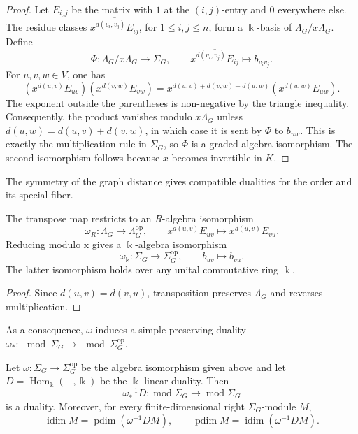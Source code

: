 \documentclass[a4paper,leqno]{amsart}
\begin{document}
\begin{proof}
Let $E_{i,j}$ be the matrix with $1$ at the $(i,j)$-entry and $0$ everywhere else.  The residue classes
$\overline{x^{d(v_i,v_j)}E_{ij}}$, for $1\leq i,j\leq n$,
form a $\Bbbk$-basis of $\Lambda_G/x\Lambda_G$.  Define
\[
\Phi:\Lambda_G/x\Lambda_G\longrightarrow\Sigma_G,
\qquad
\overline{x^{d(v_i,v_j)}E_{ij}}\longmapsto b_{v_i v_j}.
\]
For $u,v,w\in V$, one has
\[
(x^{d(u,v)}E_{uv})(x^{d(v,w)}E_{vw})
=x^{d(u,v)+d(v,w)-d(u,w)}
 (x^{d(u,w)}E_{uw}).
\]
The exponent outside the parentheses is non-negative by the triangle
inequality.  Consequently, the product vanishes modulo
$x\Lambda_G$ unless
$d(u,w)=d(u,v)+d(v,w)$, in which case it is sent by $\Phi$ to
$b_{uw}$.  This is exactly the multiplication rule in $\Sigma_G$,
so $\Phi$ is a graded algebra isomorphism.  The second isomorphism
follows because $x$ becomes invertible in $K$.
\end{proof}

The symmetry of the graph distance gives compatible dualities for the order and its special fiber.

\begin{lem}\label{lem:anti-iso}
The transpose map restricts to an $R$-algebra isomorphism
\[
\omega_R:\Lambda_G\longrightarrow\Lambda_G^{\operatorname{op}},
\qquad
x^{d(u,v)}E_{uv}\longmapsto x^{d(u,v)}E_{vu}.
\]
Reducing modulo x gives a $\Bbbk$-algebra isomorphism
\[
\omega_{\Bbbk}:\Sigma_G\longrightarrow
\Sigma_G^{\operatorname{op}},
\qquad
b_{uv}\longmapsto b_{vu}.
\]
The latter isomorphism holds over any unital commutative ring $\Bbbk$.
\end{lem}

\begin{proof}
Since $d(u,v)=d(v,u)$, transposition preserves $\Lambda_G$ and
reverses multiplication.
\end{proof}

As a consequence, $\omega$ induces  a simple-preserving duality $\omega_*:\mod \Sigma_G \to \mod \Sigma_G^{\operatorname{op}}$.

\begin{prop}\label{prop:dual-functor}
Let $\omega:\Sigma_G\rightarrow \Sigma_G^{\operatorname{op}}$
be the algebra isomorphism given above and let $D=\operatorname{Hom}_{\Bbbk}(-,\Bbbk)$ be the $\Bbbk$-linear duality. Then
$$\omega_*^{-1}D:\operatorname{mod} \Sigma_G\longrightarrow \operatorname{mod} \Sigma_G$$ is a duality. Moreover, for every finite-dimensional right $\Sigma_G$-module $M$, 
$$\operatorname{idim}M=\operatorname{pdim}(\omega^{-1}DM),
\qquad\operatorname{pdim}M=\operatorname{idim}(\omega^{-1}DM).$$
\end{prop}
\end{document}

